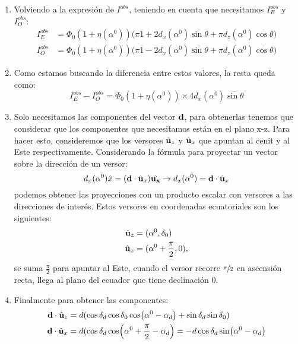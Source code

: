 \begin{enumerate}
    \item Volviendo a la expresión de $I^{obs}$, teniendo en cuenta que necesitamos  $I^{obs}_E$ y $I^{obs}_O$:
    \begin{align*}
        I^{obs}_E&= \Phi_0 (1+ \eta(\alpha^0)) \Big( \pi\overline{1} + 2d_x(\alpha^0)\overline{\sin\theta} + \pi d_z(\alpha^0)\overline{\cos\theta}  \Big) \\
        I^{obs}_O&= \Phi_0 (1+ \eta(\alpha^0)) \Big( \pi \overline{1} - 2d_x(\alpha^0)\overline{\sin\theta}   + \pi d_z(\alpha^0)\overline{\cos\theta} \Big) 
    \end{align*}

    \item Como estamos buscando la diferencia entre estos valores, la resta queda como:
    \begin{equation*}
        I^{obs}_E -  I^{obs}_O = \Phi_0 (1+ \eta(\alpha^0)) \times 4  d_x(\alpha^0)\overline{\sin\theta}
    \end{equation*}
    
    \item Solo necesitamos las componentes del vector $\bf{d}$, para obtenerlas tenemos que considerar que los componentes que necesitamos están en el plano x-z. Para hacer esto, consideremos que los versores $\hat{\bf{u}}_z$ y $\hat{\bf{u}}_x$ que apuntan al cenit y al Este respectivamente. Considerando la fórmula para proyectar un vector sobre la dirección de un versor:
    \begin{equation}
        d_x(\alpha^0) \hat{x} =  (\textbf{d}\cdot\hat{\bf{u}}_x)\hat{\bf{u_x}} \rightarrow d_x(\alpha^0) = \textbf{d}\cdot\hat{\bf{u}}_x
    \end{equation}
    podemos obtener las proyecciones con un producto escalar con versores a las direcciones de interés. Estos versores en coordenadas ecuatoriales son los siguientes:
    \begin{align*}
        \hat{\bf{u}}_z &= (\alpha^0,\delta_0 )\\
        \hat{\bf{u}}_x &= (\alpha^0 + \frac{\pi}{2},0), 
    \end{align*}
    se suma  $\frac{\pi}{2}$ para apuntar al Este, cuando el versor recorre $\nicefrac{\pi}{2}$ en ascensión recta, llega al plano del ecuador que tiene declinación $0$.
    \item Finalmente para obtener las componentes:
    \begin{align*}
        \textbf{d}\cdot\hat{\bf{u}}_z &= d (\cos\delta_d \cos\delta_0 \cos(\alpha^0 - \alpha_d) + \sin\delta_d  \sin\delta_0)\\
        \textbf{d}\cdot\hat{\bf{u}}_x &= d (\cos\delta_d \cos(\alpha^0 +\frac{\pi}{2} - \alpha_d) 
        = -d\cos\delta_d \sin(\alpha^0  - \alpha_d)
    \end{align*}
    

\end{enumerate}
